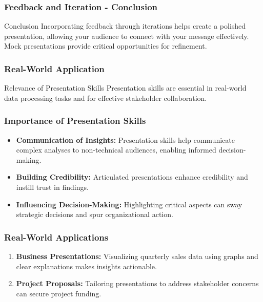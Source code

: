 \documentclass{beamer}
\begin{document}
\begin{frame}[fragile]
    \frametitle{Feedback and Iteration - Conclusion}
    \begin{block}{Conclusion}
        Incorporating feedback through iterations helps create a polished presentation, allowing your audience to connect with your message effectively. Mock presentations provide critical opportunities for refinement.
    \end{block}
\end{frame}

\begin{frame}[fragile]
    \frametitle{Real-World Application}
    \begin{block}{Relevance of Presentation Skills}
        Presentation skills are essential in real-world data processing tasks and for effective stakeholder collaboration.
    \end{block}
\end{frame}

\begin{frame}[fragile]
    \frametitle{Importance of Presentation Skills}
    \begin{itemize}
        \item \textbf{Communication of Insights:} 
            Presentation skills help communicate complex analyses to non-technical audiences, enabling informed decision-making.
        \item \textbf{Building Credibility:} 
            Articulated presentations enhance credibility and instill trust in findings.
        \item \textbf{Influencing Decision-Making:} 
            Highlighting critical aspects can sway strategic decisions and spur organizational action.
    \end{itemize}
\end{frame}

\begin{frame}[fragile]
    \frametitle{Real-World Applications}
    \begin{enumerate}
        \item \textbf{Business Presentations:} 
            Visualizing quarterly sales data using graphs and clear explanations makes insights actionable.
        \item \textbf{Project Proposals:} 
            Tailoring presentations to address stakeholder concerns can secure project funding.
    \end{enumerate}
\end{frame}
\end{document}
